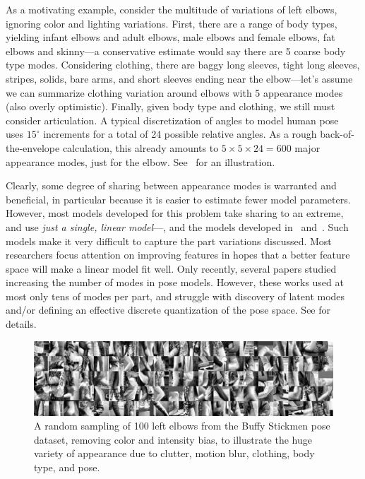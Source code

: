 As a motivating example, consider the multitude of variations of left elbows, 
ignoring color and lighting variations.  First, there are a range of body 
types, yielding infant elbows and adult elbows, male elbows and female elbows, 
fat elbows and skinny---a conservative estimate would say there are 5 coarse 
body type modes.  Considering clothing, there are baggy long sleeves, tight 
long sleeves, stripes, solids, bare arms, and short sleeves ending near the 
elbow---let's assume we can summarize clothing variation around elbows with 5 
appearance modes (also overly optimistic).  Finally, given body type and 
clothing, we still must consider articulation.  A typical discretization of 
angles to model human pose~\citep{felz05,devacrf,eichner09} uses $15^\circ$ 
increments for a total of 24 possible relative angles.  As a rough 
back-of-the-envelope calculation, this already amounts to $5 \times 5 \times 24 
= 600$ major appearance modes, just for the elbow.  See~ for an 
illustration.


Clearly, some degree of sharing between appearance modes is warranted and 
beneficial, in particular because it is easier to estimate fewer model 
parameters.  However, most models developed for this problem take sharing to an 
extreme, and use {\em just a single, linear model}---\eg, 
\citet{devacrf,eichner09,andriluka09,ddtran} and the models developed 
in~ and~.
Such models make it very difficult to capture the part variations discussed.  
Most researchers focus attention on improving features in hopes that a better 
feature space will make a linear model fit well.  Only recently, several papers 
studied increasing the number of modes in pose models. However, these works 
used at most only tens of modes per part, and struggle with discovery of latent 
modes and/or defining an effective discrete quantization of the pose space.  
See  for details.

\begin{figure}[tb!]
\centering
\includegraphics[width=0.99\linewidth]{figs/lelbs.jpg}
\caption{ \label{fig:lelbs} A random sampling of 100 left elbows from the Buffy 
Stickmen pose dataset, removing color and intensity bias, to illustrate the 
huge variety of appearance due to clutter, motion blur, clothing, body type, 
and pose.}
\end{figure}

